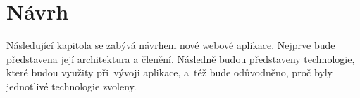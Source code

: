 \chapter{Návrh}
Následující kapitola se zabývá návrhem nové webové aplikace. Nejprve bude představena její architektura a členění. Následně budou představeny technologie, které budou využity při~vývoji aplikace, a~též bude odůvodněno, proč byly jednotlivé technologie zvoleny.




